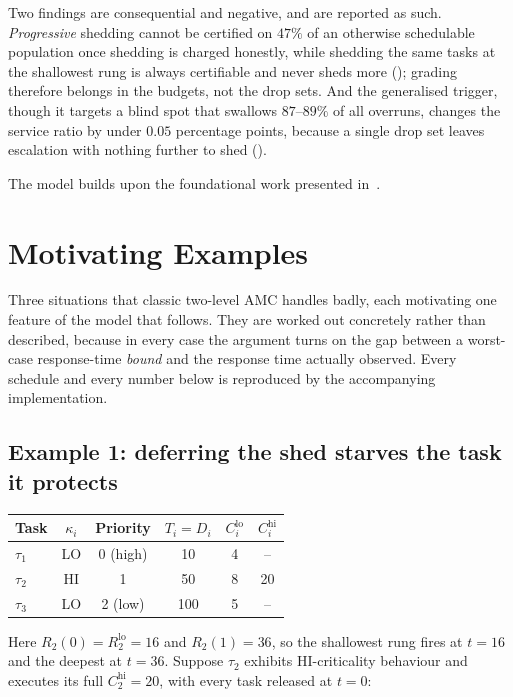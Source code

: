 Two findings are consequential and negative, and are reported as such.
\emph{Progressive} shedding cannot be certified on $47\%$ of an otherwise
schedulable population once shedding is charged honestly, while shedding the
same tasks at the shallowest rung is always certifiable and never sheds more
(); grading therefore belongs in the budgets, not the
drop sets. And the generalised trigger, though it targets a blind spot that
swallows $87$--$89\%$ of all overruns, changes the service ratio by under
$0.05$ percentage points, because a single drop set leaves escalation with
nothing further to shed ().

The model builds upon the foundational work presented in~\cite{9804600}.

\section{Motivating Examples}
\label{sec:motivating}

Three situations that classic two-level AMC handles badly, each motivating one
feature of the model that follows. They are worked out concretely rather than
described, because in every case the argument turns on the gap between a
worst-case response-time \emph{bound} and the response time actually observed.
Every schedule and every number below is reproduced by the accompanying
implementation.

\subsection{Example 1: deferring the shed starves the task it protects}
\label{sec:ex-defer}

\begin{center}
\begin{tabular}{lccccc}
\toprule
Task & $\kappa_i$ & Priority & $T_i = D_i$ & $C_i^{\mathrm{lo}}$ & $C_i^{\mathrm{hi}}$ \\
\midrule
$\tau_1$ & LO & 0 (high) & 10  & 4 & -- \\
$\tau_2$ & HI & 1        & 50  & 8 & 20 \\
$\tau_3$ & LO & 2 (low)  & 100 & 5 & -- \\
\bottomrule
\end{tabular}
\end{center}

\noindent Here $R_2(0) = R_2^{\mathrm{lo}} = 16$ and $R_2(1) = 36$, so the
shallowest rung fires at $t = 16$ and the deepest at $t = 36$. Suppose
$\tau_2$ exhibits HI-criticality behaviour and executes its full
$C_2^{\mathrm{hi}} = 20$, with every task released at $t = 0$:

